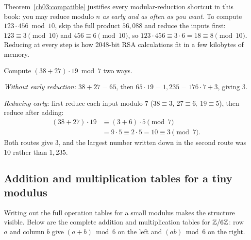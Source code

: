 \begin{whybox}
Theorem~\ref{ch03:compatible} justifies every modular-reduction shortcut in this book: you may reduce modulo $n$ \emph{as early and as often as you want}. To compute $123 \cdot 456 \bmod 10$, skip the full product $56{,}088$ and reduce the inputs first: $123 \equiv 3 \pmod{10}$ and $456 \equiv 6 \pmod{10}$, so $123 \cdot 456 \equiv 3\cdot 6 = 18 \equiv 8 \pmod{10}$. Reducing at every step is how 2048-bit RSA calculations fit in a few kilobytes of memory.
\end{whybox}

\begin{example}
\label{ch03:reduce-early}
Compute $(38 + 27)\cdot 19 \bmod 7$ two ways.

\emph{Without early reduction:} $38 + 27 = 65$, then $65 \cdot 19 = 1{,}235 = 176\cdot 7 + 3$, giving $3$.

\emph{Reducing early:} first reduce each input modulo $7$ ($38 \equiv 3$, $27 \equiv 6$, $19 \equiv 5$), then reduce after adding:
\begin{align*}
  (38 + 27)\cdot 19 &\equiv (3 + 6)\cdot 5 \pmod{7} \\
                    &= 9 \cdot 5 \equiv 2 \cdot 5 = 10 \equiv 3 \pmod{7}.
\end{align*}
Both routes give $3$, and the largest number written down in the second route was $10$ rather than $1{,}235$.
\end{example}

\subsection{Addition and multiplication tables for a tiny modulus}

Writing out the full operation tables for a small modulus makes the structure visible. Below are the complete addition and multiplication tables for $\mathbb{Z}/6\mathbb{Z}$: row $a$ and column $b$ give $(a+b) \bmod 6$ on the left and $(ab) \bmod 6$ on the right.

